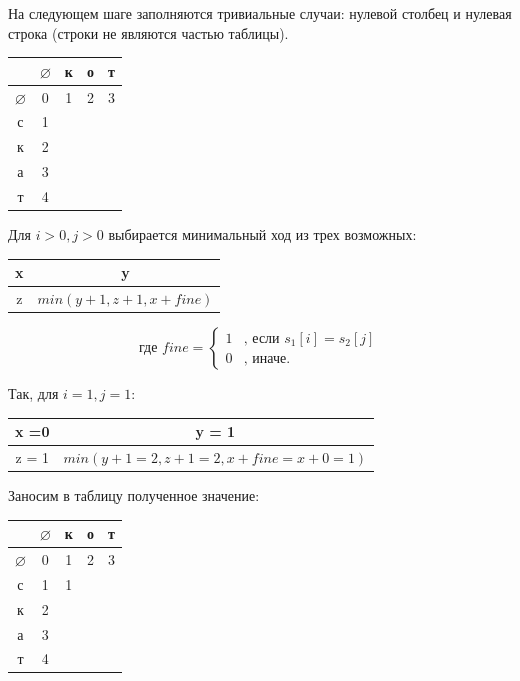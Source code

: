 \documentclass[14pt]{report}
\begin{document}
На следующем шаге заполняются тривиальные случаи: нулевой столбец и нулевая строка (строки не являются частью таблицы).

\begin{tabular}{ | c || c | c | c | c | }
\hline
    & $\varnothing$ & к & о & т \\ \hline \hline
	$\varnothing$ & 0 & 1 & 2 & 3 \\ \hline
	с & 1 &  &  &  \\ \hline
  к & 2 &  &  &  \\ \hline
  а & 3 &  &  &  \\ \hline
  т & 4 &  &  &  \\ \hline
\end{tabular}

Для $i > 0, j > 0$ выбирается минимальный ход из трех возможных:

\begin{tabular}{ | c | c | }
\hline
  x  & y  \\ \hline
	z & $min(y + 1, z + 1, x + fine)$ \\ \hline
\end{tabular}


\begin{equation*}
\text{где }fine =
 \begin{cases}
	 1 &\text{, если $s_{1}[i] = s_{2}[j]$}\\
   0 &\text{, иначе.}
 \end{cases}
\end{equation*}

Так, для $i = 1, j = 1$:

\begin{tabular}{ | c | c | }
\hline
  x =0   & y = 1  \\ \hline
	z = 1 & $min(y + 1 = 2, z + 1 = 2, x + fine = x + 0 = 1)$ \\ \hline
\end{tabular}

Заносим в таблицу полученное значение:

\begin{tabular}{ | c || c | c | c | c | }
\hline
    & $\varnothing$ & к & о & т \\ \hline \hline
	$\varnothing$ & 0 & 1 & 2 & 3 \\ \hline
	с & 1 & 1 &  &  \\ \hline
  к & 2 &  &  &  \\ \hline
  а & 3 &  &  &  \\ \hline
  т & 4 &  &  &  \\ \hline
\end{tabular}
\end{document}
